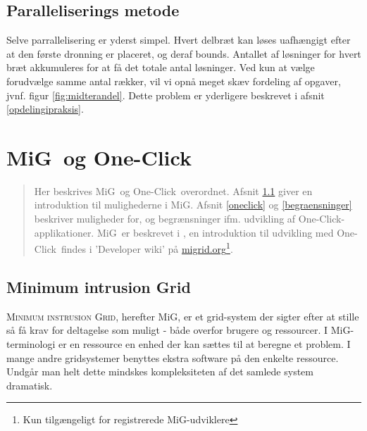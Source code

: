 \documentclass[draft,a4paper,11pt]{article}
\newcommand{\mig}{MiG}
\newcommand{\oc}{One-Click}
\begin{document}
\subsection{Paralleliserings metode}\label{parallel}

Selve parrallelisering er yderst simpel. Hvert delbræt kan løses uafhængigt efter at den første dronning er placeret, og deraf bounds. Antallet af løsninger for hvert bræt akkumuleres for at få det totale antal løsninger. Ved kun at vælge forudvælge samme antal rækker, vil vi opnå meget skæv fordeling af opgaver, jvnf. figur \ref{fig:midterandel}. Dette problem er yderligere beskrevet i afsnit \ref{opdelingipraksis}.


\section{\mig\ og \oc}\label{migogoneclick}
\begin{verse}
	Her beskrives \mig\ og \oc\ overordnet. Afsnit \ref{mig} giver en introduktion til mulighederne i \mig. Afsnit \ref{oneclick} og \ref{begraensninger} beskriver muligheder for, og begrænsninger ifm. udvikling af \oc-applikationer. \mig\ er beskrevet i \cite{simplemig,mig}, en introduktion til udvikling med \oc\ findes i 'Developer wiki' på \url{migrid.org}\footnote{Kun tilgængeligt for registrerede \mig-udviklere}.
\end{verse}


\subsection{Minimum intrusion Grid}\label{mig}

\textsc{Minimum instrusion Grid}, herefter \mig, er et grid-system der sigter efter at stille så få krav for deltagelse som muligt - både overfor brugere og ressourcer. I \mig-terminologi er en ressource en enhed der kan sættes til at beregne et problem. I mange andre gridsystemer benyttes ekstra software på den enkelte ressource. Undgår man helt dette mindskes kompleksiteten af det samlede system dramatisk. 
\end{document}
